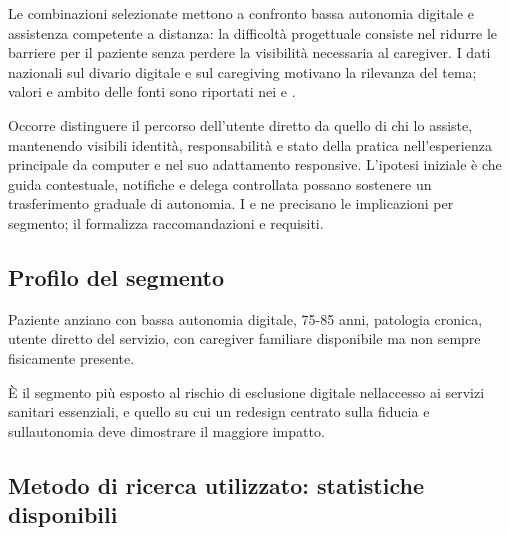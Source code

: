 
Le combinazioni selezionate mettono a confronto bassa autonomia digitale e
assistenza competente a distanza: la difficoltà progettuale consiste nel
ridurre le barriere per il paziente senza perdere la visibilità necessaria
al caregiver. I dati nazionali sul divario digitale e sul caregiving
motivano la rilevanza del tema; valori e ambito delle fonti sono riportati nei  e .


Occorre distinguere il percorso dell'utente diretto da quello di chi lo
assiste, mantenendo visibili identità, responsabilità e stato della pratica
nell'esperienza principale da computer e nel suo adattamento responsive.
L'ipotesi iniziale è che guida contestuale, notifiche e delega controllata
possano sostenere un trasferimento graduale di autonomia. I  e 
ne precisano le implicazioni per segmento; il  formalizza
raccomandazioni e requisiti.

\label{doc:a:04a}

\subsection{Profilo del segmento}


Paziente anziano con bassa autonomia digitale, 75-85 anni, patologia cronica,
utente diretto del servizio, con caregiver familiare disponibile ma non
sempre fisicamente presente.


È il segmento più esposto al rischio di esclusione digitale
nell\textquotesingle accesso ai servizi sanitari essenziali, e quello su
cui un redesign centrato sulla fiducia e sull\textquotesingle autonomia
deve dimostrare il maggiore impatto.

\subsection[Statistiche disponibili]{Metodo di ricerca utilizzato: statistiche disponibili}

